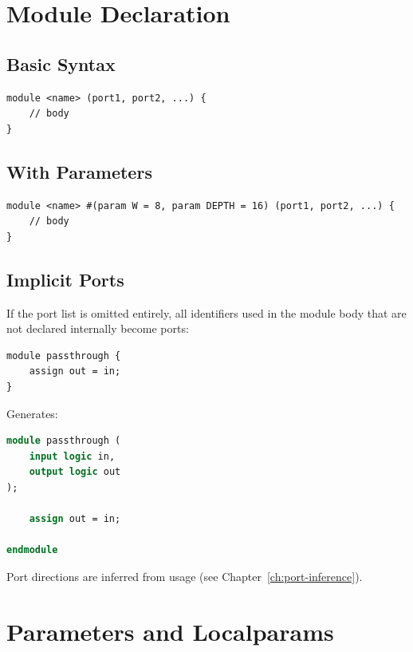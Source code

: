 \documentclass[lang=en,11pt]{elegantbook}
\begin{document}
\chapter{Module Declaration}

\section{Basic Syntax}

\begin{lstlisting}[language=Slip]
module <name> (port1, port2, ...) {
    // body
}
\end{lstlisting}

\section{With Parameters}

\begin{lstlisting}[language=Slip]
module <name> #(param W = 8, param DEPTH = 16) (port1, port2, ...) {
    // body
}
\end{lstlisting}

\section{Implicit Ports}

If the port list is omitted entirely, all identifiers used in the module body that are not declared internally become ports:

\begin{lstlisting}[language=Slip]
module passthrough {
    assign out = in;
}
\end{lstlisting}

Generates:

\begin{lstlisting}[language=SystemVerilog]
module passthrough (
    input logic in,
    output logic out
);

    assign out = in;

endmodule
\end{lstlisting}

Port directions are inferred from usage (see Chapter~\ref{ch:port-inference}).

\chapter{Parameters and Localparams}
\end{document}
